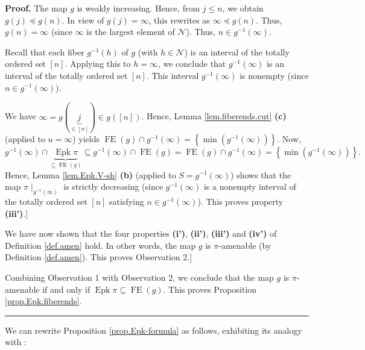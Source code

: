 \documentclass[numbers=enddot,12pt,final,onecolumn,notitlepage]{scrartcl}%
\theoremstyle{definition}
\newenvironment{proof}[1][Proof]{\noindent\textbf{#1.} }{\ \rule{0.5em}{0.5em}}
\newenvironment{verlong}{}{}
\begin{document}
\begin{verlong}
\begin{proof}
The map $g$ is weakly increasing. Hence, from $j\leq n$, we obtain $g\left(
j\right)  \preccurlyeq g\left(  n\right)  $. In view of $g\left(  j\right)
=\infty$, this rewrites as $\infty\preccurlyeq g\left(  n\right)  $. Thus,
$g\left(  n\right)  =\infty$ (since $\infty$ is the largest element of
$\mathcal{N}$). Thus, $n\in g^{-1}\left(  \infty\right)  $.

Recall that each fiber $g^{-1}\left(  h\right)  $ of $g$ (with $h\in
\mathcal{N}$) is an interval of the totally ordered set $\left[  n\right]  $.
Applying this to $h=\infty$, we conclude that $g^{-1}\left(  \infty\right)  $
is an interval of the totally ordered set $\left[  n\right]  $. This interval
$g^{-1}\left(  \infty\right)  $ is nonempty (since $n\in g^{-1}\left(
\infty\right)  $).

We have $\infty=g\left(  \underbrace{j}_{\in\left[  n\right]  }\right)  \in
g\left(  \left[  n\right]  \right)  $. Hence, Lemma \ref{lem.fiberends.cut}
\textbf{(c)} (applied to $u=\infty$) yields $\operatorname*{FE}\left(
g\right)  \cap g^{-1}\left(  \infty\right)  =\left\{  \min\left(
g^{-1}\left(  \infty\right)  \right)  \right\}  $. Now,%
\[
g^{-1}\left(  \infty\right)  \cap\underbrace{\operatorname{Epk}\pi
}_{\subseteq\operatorname*{FE}\left(  g\right)  }\subseteq g^{-1}\left(
\infty\right)  \cap\operatorname*{FE}\left(  g\right)  =\operatorname*{FE}%
\left(  g\right)  \cap g^{-1}\left(  \infty\right)  =\left\{  \min\left(
g^{-1}\left(  \infty\right)  \right)  \right\}  .
\]
Hence, Lemma \ref{lem.Epk.V-sh} \textbf{(b)} (applied to $S=g^{-1}\left(
\infty\right)  $) shows that the map $\pi\mid_{g^{-1}\left(  \infty\right)  }$
is strictly decreasing (since $g^{-1}\left(  \infty\right)  $ is a nonempty
interval of the totally ordered set $\left[  n\right]  $ satisfying $n\in
g^{-1}\left(  \infty\right)  $). This proves property \textbf{(iii')}.]

We have now shown that the four properties \textbf{(i')}, \textbf{(ii')},
\textbf{(iii')} and \textbf{(iv')} of Definition \ref{def.amen} hold. In other
words, the map $g$ is $\pi$-amenable (by Definition \ref{def.amen}). This
proves Observation 2.]

Combining Observation 1 with Observation 2, we conclude that the map $g$ is
$\pi$-amenable if and only if $\operatorname{Epk}\pi\subseteq
\operatorname*{FE}\left(  g\right)  $. This proves Proposition
\ref{prop.Epk.fiberends}.
\end{proof}
\end{verlong}

We can rewrite Proposition \ref{prop.Epk-formula} as follows, exhibiting its
analogy with \cite[Proposition 2.2]{Stembr97}:
\end{document}
